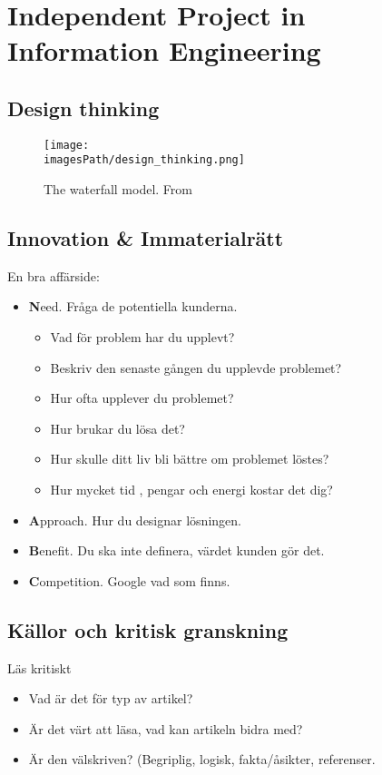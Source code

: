 \chapter{Independent Project in Information Engineering}

\section{Design thinking}
\begin{figure}[!ht]
    \centering
    \texttt{[image: \\imagesPath/design\_thinking.png]}
    \caption{The waterfall model. From~\cite{}} %
\end{figure}


\section{Innovation \& Immaterialrätt}
En bra affärside:
\begin{itemize}
\item \textbf{N}eed. Fråga de potentiella kunderna.
  \begin{itemize}
  \item Vad för problem har du upplevt?
  \item Beskriv den senaste gången du upplevde problemet?
  \item Hur ofta upplever du problemet?
  \item Hur brukar du lösa det?
  \item Hur skulle ditt liv bli bättre om problemet löstes?
    \item Hur mycket tid , pengar och energi kostar det dig?
  \end{itemize}
\item \textbf{A}pproach. Hur du designar lösningen.
\item \textbf{B}enefit. Du ska inte definera, värdet kunden gör det.
\item \textbf{C}ompetition. Google vad som finns.
\end{itemize}

\section{Källor och kritisk granskning}
Läs kritiskt
\begin{itemize}
\item Vad är det för typ av artikel?
\item Är det värt att läsa, vad kan artikeln bidra med?
\item Är den välskriven? (Begriplig, logisk, fakta/åsikter, referenser.
\end{itemize}
  
